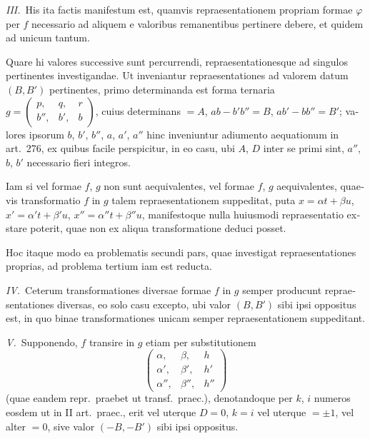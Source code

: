\documentclass[12pt,a4paper]{article}
\theoremstyle{plain}
\theoremstyle{definition}
\theoremstyle{remark}
\begin{document}
\begin{otherlanguage}{latin}
\textit{III.}\ His ita factis manifestum est, quamvis repraesentationem propriam formae $\varphi$ per $f$ necessario ad aliquem e valoribus remanentibus pertinere debere, et quidem ad unicum tantum.

Quare hi valores successive sunt percurrendi, repraesentationesque ad singulos pertinentes investigandae. Ut inveniantur repraesentationes ad valorem datum $(B, B')$ pertinentes, primo determinanda est forma ternaria $g = \begin{pmatrix} p, & q, & r \\ b'', & b', & b \end{pmatrix}$, cuius determinans $= A$, $ab - b'b'' = B$, $ab' - bb'' = B'$; valores ipsorum $b$, $b'$, $b''$, $a$, $a'$, $a''$ hinc inveniuntur adiumento aequationum in art.\ 276, ex quibus facile perspicitur, in eo casu, ubi $A$, $D$ inter se primi sint, $a''$, $b$, $b'$ necessario fieri integros.

Iam si vel formae $f$, $g$ non sunt aequivalentes, vel formae $f$, $g$ aequivalentes, quaevis transformatio $f$ in $g$ talem repraesentationem suppeditat, puta $x = \alpha t + \beta u$, $x' = \alpha' t + \beta' u$, $x'' = \alpha'' t + \beta'' u$, manifestoque nulla huiusmodi repraesentatio exstare poterit, quae non ex aliqua transformatione deduci posset.

Hoc itaque modo ea problematis secundi pars, quae investigat repraesentationes proprias, ad problema tertium iam est reducta.

\textit{IV.}\ Ceterum transformationes diversae formae $f$ in $g$ semper producunt repraesentationes diversas, eo solo casu excepto, ubi valor $(B, B')$ sibi ipsi oppositus est, in quo binae transformationes unicam semper repraesentationem suppeditant.

\textit{V.}\ Supponendo, $f$ transire in $g$ etiam per substitutionem
\[
\begin{pmatrix} \alpha, & \beta, & h \\ \alpha', & \beta', & h' \\ \alpha'', & \beta'', & h'' \end{pmatrix}
\]
(quae eandem repr.\ praebet ut transf.\ praec.), denotandoque per $k$, $i$ numeros eosdem ut in II art.\ praec., erit vel uterque $D = 0$, $k = i$ vel uterque $= \pm 1$, vel alter $= 0$, sive valor $(-B, -B')$ sibi ipsi oppositus.

\end{otherlanguage}
\end{document}
